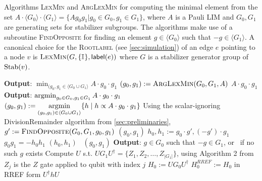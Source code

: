 \begin{algorithm}
    \caption{
        Algorithms \textsc{LexMin} and \textsc{ArgLexMin} for computing the minimal element from the set $A \cdot \langle G_0\rangle \cdot \langle G_1\rangle=\{Ag_0g_1|g_0\in G_0,g_1\in G_1\}$, where $A$ is a Pauli LIM and $G_0, G_1$ are generating sets for stabilizer subgroups.
        The algorithms make use of a subroutine \textsc{FindOpposite} for finding an element $g \in \langle G_0\rangle$ such that $-g \in \langle G_1\rangle$.
        A canonical choice for the \textsc{Rootlabel} (see \autoref{sec:simulation}) of an edge $e$ pointing to a node $v$ is $\textsc{LexMin}(G, \{\mathbb{I}_{}\}, \textsf{label}(e))$ where $G$ is a stabilizer generator group of $\text{Stab}(v)$.
        \label{alg:lexmin}
    }
    \begin{algorithmic}[1]
        \Statex \textbf{Output}: $\min_{(g_0, g_1 \in  \langle G_0 \cup G_1 \rangle} A \cdot g_0 \cdot g_1$
        \State $(g_0, g_1) := \textsc{ArgLexMin}(G_0, G_1, A)$
        \State \Return $A \cdot g_0 \cdot g_1$
        \EndProcedure
        \Statex 
        \Statex \textbf{Output}: $\operatorname*{argmin}_{g_0 \in G_0, g_1\in G_1} A \cdot g_0 \cdot g_1$
        \State $(g_0, g_1) := \displaystyle \operatorname*{argmin}_{(g_0, g_1) \in \langle G_0 \cup G_1 \rangle} \{h \mid h \propto A \cdot g_0 \cdot g_1\}$
        \Comment Using the scalar-ignoring DivisionRemainder algorithm from \autoref{sec:preliminaries}, 
        \label{line:division-remainder}
        \State $g' := \textsc{FindOpposite}(G_0, G_1, g_0, g_1)$
        \State \Return $(g_0, g_1)$
        \Else
        \State $h_0, h_1 := g_0 \cdot g', (-g') \cdot g_1$
        \Comment $g_0 g_1 = - h_0 h_1$
         \Return $(h_0,h_1)$
        \label{line:choose-smaller}
        \Else \ \Return $(g_0,g_1)$
        \EndIf
        \EndIf
        \EndProcedure
%
        \Statex
        \Statex \textbf{Output}: $g\in G_0$ such that $-g \in G_1$, or \none~if no such $g$ exists
        \State Compute $U$ s.t. $U G_1 U^{\dagger} = \{Z_1, Z_2, \dots, Z_{|G_1|}\}$, using Algorithm 2 from \cite{garcia2012efficient}
        \Comment $Z_j$ is the $Z$ gate applied to qubit with index $j$
        \State $H_0 := UG_0 U^{\dagger}$
        \State $H_0^{RREF} := H_0$ in RREF form
        \State \Return $U^{\dagger} h U$
        \EndIf
        \EndFor
        \State \Return \none
        \EndProcedure
    \end{algorithmic}
\end{algorithm}

